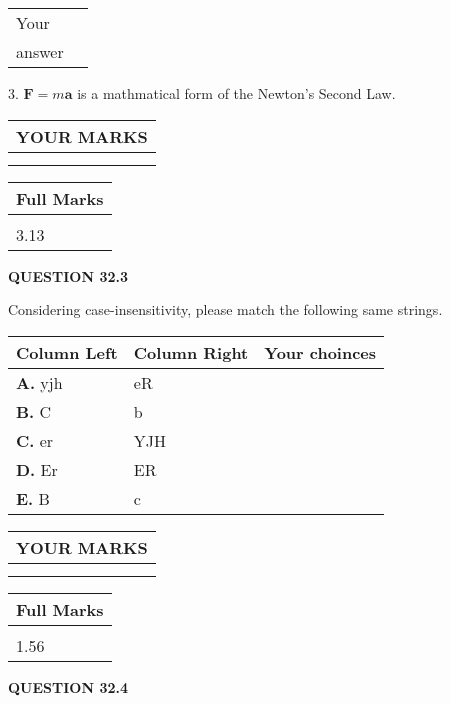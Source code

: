 \documentclass[12pt]{article}
\begin{document}
\noindent\begin{tabular}{|l|l|}\hline Your&\hspace{.2in} \\ answer&\hspace{.2in} \\ \hline \end{tabular}
3.  %
$\mathbf{F}=m\mathbf{a}$ is a mathmatical form of
the Newton's Second Law.
 

 
\vspace{0.3in}
  
\vspace{0.2in}
  
\noindent\begin{tabular}{|l|}
\hline
 YOUR MARKS  \\
\hline
 \\ 
 \\ 
\hline
\end{tabular}
\hspace{0.05in} \begin{tabular}{|l|}
\hline
 Full Marks  \\
\hline
 \\ 
3.13 \\
\hline
\end{tabular}
{\textbf{\Large{QUESTION
32.3 
}}}
  
  
Considering case-insensitivity, please match the following same strings.
  
  
\begin{tabular}{|l|l|l|}
 \hline
 Column Left & Column Right  & Your choinces \\ 
 \hline
{\textbf{\large{
A.}}}
yjh
  & 
eR
 & 
 \\ 
 \hline
{\textbf{\large{
B.}}}
C
  & 
b
 & 
 \\ 
 \hline
{\textbf{\large{
C.}}}
er
  & 
YJH
 & 
 \\ 
 \hline
{\textbf{\large{
D.}}}
Er
  & 
ER
 & 
 \\ 
 \hline
{\textbf{\large{
E.}}}
B
  & 
c
 & 
 \\ 
 \hline
 \end{tabular}
  
  
 
  
\vspace{0.2in}
  
\noindent\begin{tabular}{|l|}
\hline
 YOUR MARKS  \\
\hline
 \\ 
 \\ 
\hline
\end{tabular}
\hspace{0.05in} \begin{tabular}{|l|}
\hline
 Full Marks  \\
\hline
 \\ 
1.56 \\
\hline
\end{tabular}
{\textbf{\Large{QUESTION
32.4 
}}}
  
\end{document}
